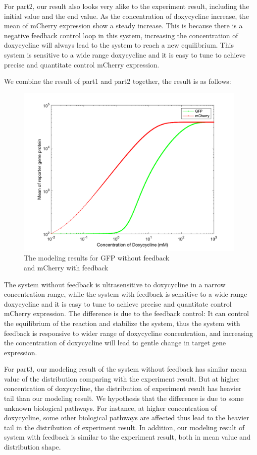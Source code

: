 For part2, our result also looks very alike to the experiment result, including the initial value and the end value. As the concentration of doxycycline increase, the mean of mCherry expression show a steady increase. This is because there is a negative feedback control loop in this system, increasing the concentration of doxycycline will always lead to the system to reach a new equilibrium. This system is sensitive to a wide range doxycycline and it is easy to tune to achieve precise and quantitate control mCherry expression.

We combine the result of part1 and part2 together, the result is as follows:

\begin{figure}[H]
\centering
\includegraphics[width=0.8\linewidth]{Figures/Q3_3.png}
\caption{The modeling results for GFP without feedback \\ and mCherry with feedback}
\label{part_3_3}
\end{figure}

The system without feedback is ultrasensitive to doxycycline in a narrow concentration range, while the system with feedback is sensitive to a wide range doxycycline and it is easy to tune to achieve precise and quantitate control mCherry expression. The difference is due to the feedback control: It can control the equilibrium of the reaction and stabilize the system, thus the system with feedback is responsive to wider range of doxycycline concentration, and increasing the concentration of doxycycline will lead to gentle change in target gene expression.

For part3, our modeling result of the system without feedback has similar mean value of the distribution comparing with the experiment result. But at higher concentration of doxycycline, the distribution of experiment result has heavier tail than our modeling result. We hypothesis that the difference is due to some unknown biological pathways. For instance, at higher concentration of doxycycline, some other biological pathways are affected thus lead to the heavier tail in the distribution of experiment result. In addition, our modeling result of system with feedback is similar to the experiment result, both in mean value and distribution shape.

